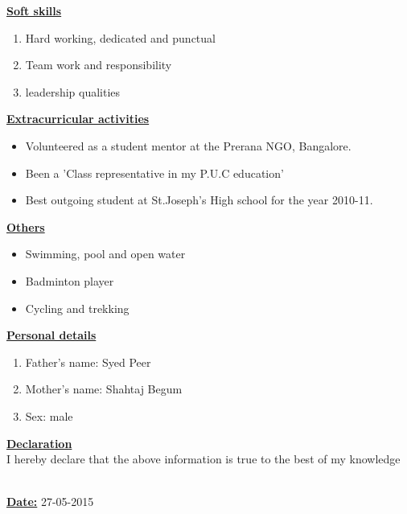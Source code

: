\documentclass[10pt]{article}
\begin{document}
			\underline{\textbf{\Large{Soft skills}}}
			\begin{enumerate}
				\item{Hard working, dedicated and punctual}
				\item{Team work and responsibility}
				\item{leadership qualities} 
				
			\end{enumerate}
			
			\hfill
			
		\underline{\textbf{\Large{Extracurricular activities}}}
		\begin{itemize}
			\item{Volunteered as a student mentor at the Prerana NGO, Bangalore.}
			\item{Been a 'Class representative in my P.U.C education'}
			\item{Best outgoing student at St.Joseph's High school for the year 2010-11.}
			
		\end{itemize}
		
		\hfill
		
			\underline{\textbf{\Large{Others}}}
			\begin{itemize}
				\item{Swimming, pool and open water}
				\item{Badminton player}
				\item{Cycling and trekking}					
				
			\end{itemize}
			
			\hfill
			
				\underline{\textbf{\Large{Personal details}}}
				\begin{enumerate}
					\item{Father's name: Syed Peer}
					\item{Mother's name: Shahtaj Begum}
					\item{Sex: male} 
					
				\end{enumerate}
				
				\hfill
				
				
					\underline{\textbf{\Large{Declaration}}} \\
					
					I hereby declare that the above information is true to the best of
					my knowledge
					
					\hfill\\
					
					\underline{\textbf{\large{Date:}}}  27-05-2015
	
\end{document}
